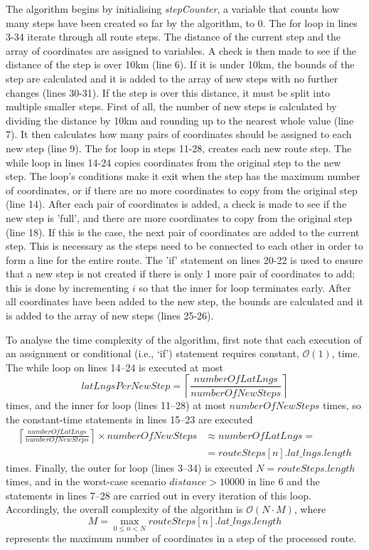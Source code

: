 \documentclass[authoryearcitations]{UoYCSproject}
\begin{document}
The algorithm begins by initialising \textit{stepCounter}, a variable that counts how many steps have been created so far by the algorithm, to 0. The for loop in lines 3-34 iterate through all route steps. The distance of the current step and the array of coordinates are assigned to variables. A check is then made to see if the distance of the step is over 10km (line 6). If it is under 10km, the bounds of the step are calculated and it is added to the array of new steps with no further changes (lines 30-31). If the step is over this distance, it must be split into multiple smaller steps. First of all, the number of new steps is calculated by dividing the distance by 10km and rounding up to the nearest whole value (line 7). It then calculates how many pairs of coordinates should be assigned to each new step (line 9). The for loop in steps 11-28, creates each new route step. The while loop in lines 14-24 copies coordinates from the original step to the new step. The loop's conditions make it exit when the step has the maximum number of coordinates, or if there are no more coordinates to copy from the original step (line 14). After each pair of coordinates is added, a check is made to see if the new step is 'full', and there are more coordinates to copy from the original step (line 18). If this is the case, the next pair of coordinates are added to the current step. This is necessary as the steps need to be connected to each other in order to form a line for the entire route. The 'if' statement on lines 20-22 is used to ensure that a new step is not created if there is only 1 more pair of coordinates to add; this is done by incrementing $i$ so that the inner for loop terminates early. After all coordinates have been added to the new step, the bounds are calculated and it is added to the array of new steps (lines 25-26).

To analyse the time complexity of the algorithm, first note that each execution of an assignment or conditional (i.e., `if') statement requires constant, $\mathcal{O}(1)$, time. The while loop on lines 14--24 is executed at most
\[
  \mathit{latLngsPerNewStep} = \left\lceil \frac{\mathit{numberOfLatLngs}}{\mathit{numberOfNewSteps}}\right\rceil
\] 
times, and the inner for loop (lines 11--28) at most $\mathit{numberOfNewSteps}$ times, so the constant-time statements in lines 15--23 are executed
\[
 \begin{array}{ll}
  \left\lceil \frac{\mathit{numberOfLatLngs}}{\mathit{numberOfNewSteps}}\right\rceil \times \mathit{numberOfNewSteps} & \approx \mathit{numberOfLatLngs} = \\
  & = \mathit{routeSteps[n].lat\_lngs.length}
  \end{array}
\]
times. Finally, the outer for loop (lines 3--34) is executed $N=\mathit{routeSteps.length}$ times, and in the worst-case scenario $\mathit{distance}>10000$ in line 6 and the statements in lines 7--28 are carried out in every iteration of this loop. Accordingly, the overall complexity of the algorithm is $\mathcal{O}(N \cdot M)$, where 
\[
  M = \max_{0\leq n<N} \mathit{routeSteps[n].lat\_lngs.length}
\]
represents the maximum number of coordinates in a step of the processed route.
\end{document}
